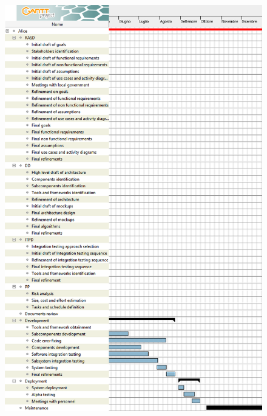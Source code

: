 \begin{figure}[H]
	\centering
	\includegraphics[height=\textheight, keepaspectratio]{resource_allocation/diagrams/ScheduleAlice2.png}
\end{figure}

